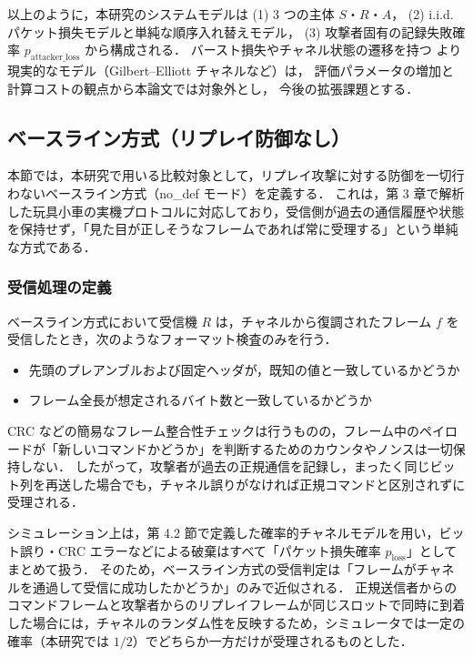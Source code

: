 \documentclass[twocolumn,10pt,a4paper]{jsarticle}
\begin{document}
以上のように，本研究のシステムモデルは
(1) 3 つの主体 $S$・$R$・$A$，
(2) i.i.d. パケット損失モデルと単純な順序入れ替えモデル，
(3) 攻撃者固有の記録失敗確率 $p_{\mathrm{attacker\_loss}}$
から構成される．
バースト損失やチャネル状態の遷移を持つ
より現実的なモデル（Gilbert--Elliott チャネルなど\cite{Hasslinger2008GE,Jiang2000Modeling}）は，
評価パラメータの増加と計算コストの観点から本論文では対象外とし，
今後の拡張課題とする．

\subsection{ベースライン方式（リプレイ防御なし）}

本節では，本研究で用いる比較対象として，リプレイ攻撃に対する防御を一切行わないベースライン方式（no\_def モード）を定義する．
これは，第 3 章で解析した玩具小車の実機プロトコルに対応しており，受信側が過去の通信履歴や状態を保持せず，「見た目が正しそうなフレームであれば常に受理する」という単純な方式である．

\subsubsection{受信処理の定義}

ベースライン方式において受信機 $R$ は，チャネルから復調されたフレーム $f$ を受信したとき，次のようなフォーマット検査のみを行う．

\begin{itemize}
  \item 先頭のプレアンブルおよび固定ヘッダが，既知の値と一致しているかどうか
  \item フレーム全長が想定されるバイト数と一致しているかどうか
\end{itemize}

CRC などの簡易なフレーム整合性チェックは行うものの，フレーム中のペイロードが「新しいコマンドかどうか」を判断するためのカウンタやノンスは一切保持しない．
したがって，攻撃者が過去の正規通信を記録し，まったく同じビット列を再送した場合でも，チャネル誤りがなければ正規コマンドと区別されずに受理される．

シミュレーション上は，第 4.2 節で定義した確率的チャネルモデルを用い，ビット誤り・CRC エラーなどによる破棄はすべて「パケット損失確率 $p_{\mathrm{loss}}$」としてまとめて扱う．
そのため，ベースライン方式の受信判定は「フレームがチャネルを通過して受信に成功したかどうか」のみで近似される．
正規送信者からのコマンドフレームと攻撃者からのリプレイフレームが同じスロットで同時に到着した場合には，チャネルのランダム性を反映するため，シミュレータでは一定の確率（本研究では $1/2$）でどちらか一方だけが受理されるものとした．
\end{document}
